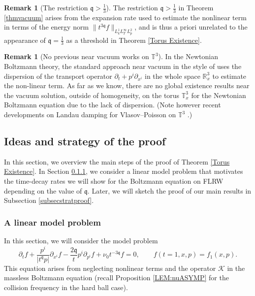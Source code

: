 \documentclass[reqno]{amsart}
\newcommand{\pv}{p}
\def\R{\mathbb R}
\newcommand{\qq}{\mathfrak{q}}
\newcommand{\tq}{t^{\qq}}
\newcommand{\T}{\mathbb{T}}
\theoremstyle{definition}
\newtheorem{remark}[theorem]{Remark}
\numberwithin{equation}{section}
\numberwithin{theorem}{section}
\begin{document}
\begin{remark}[The restriction \(\qq>\frac{1}{3}\)] The restriction \(\qq>\frac{1}{3}\) in Theorem \ref{thmvacuum} arises from the expansion rate used to estimate the nonlinear term in terms of the energy norm \(\|t^{3\qq} f\|_{L^1_kL^\infty_TL^2_{\pv}}\), and is thus a priori unrelated to the appearance of \(\qq=\frac{1}{3}\) as a threshold in Theorem \ref{Torus Existence}. 
\end{remark}

\begin{remark}[No previous near vacuum works on \(\mathbb{T}^3\)]
    In the Newtonian Boltzmann theory, the standard approach near vacuum in the style of \cite{MR0760333} uses the dispersion of the transport operator $\partial_t + p^i \partial_{x^i}$ in the whole space $\R^3_x$ to estimate the non-linear term. As far as we know, there are no global existence results near the vacuum solution, outside of homogeneity, on the torus $\T^3_x$ for the Newtonian Boltzmann equation due to the lack of dispersion. (Note however recent developments on Landau damping for Vlasov--Poisson on \(\mathbb{T}^3\) \cite{MouhotVillani2011, CMM16, GNR21}.)
\end{remark}


\subsection{Ideas and strategy of the proof}

In this section, we overview the main steps of the proof of Theorem \ref{Torus Existence}.  In Section \ref{subseclinearmodel}, we consider a linear model problem that motivates the time-decay rates we will show for the Boltzmann equation on FLRW depending on the value of \(\qq\). Later, we will sketch the proof of our main results in Subsection \ref{subsecstratproof}.  

\subsubsection{A linear model problem}\label{subseclinearmodel}

In this section, we will consider the model problem
\begin{equation}
    \partial_t f+ \frac{\pv^i}{|\tq \pv|} \partial_{x^i} f
    -\frac{2\qq }{t} p^i\partial_{p^i} f
    +
    \nu_0 t^{-3\qq} f
=
0, \qquad f(t=1,x,p)=f_1(x,p).
\label{rBoltz.model.second}
\end{equation}
This equation arises from neglecting nonlinear terms and the operator \(\mathcal{K}\) in the massless Boltzmann equation (recall Proposition \ref{LEM:nuASYMP} for the collision frequency in the hard ball case). 
\end{document}
